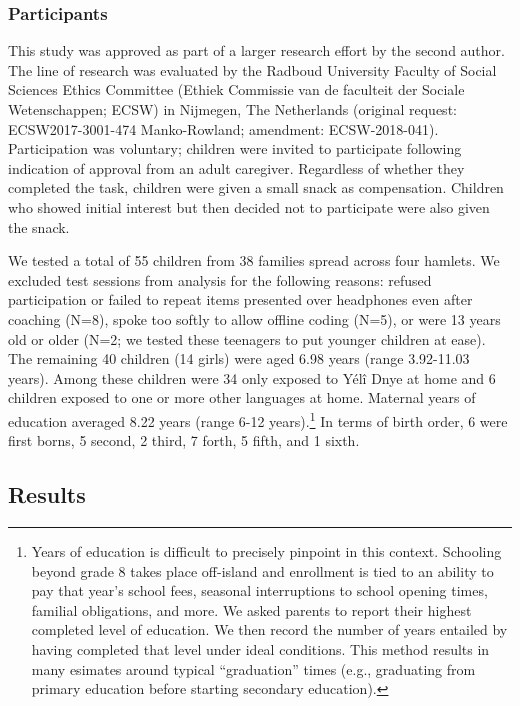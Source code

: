 \documentclass[english,,man,floatsintext]{apa6}
\begin{document}
\subsubsection{Participants}\label{participants}

This study was approved as part of a larger research effort by the
second author. The line of research was evaluated by the Radboud
University Faculty of Social Sciences Ethics Committee (Ethiek Commissie
van de faculteit der Sociale Wetenschappen; ECSW) in Nijmegen, The
Netherlands (original request: ECSW2017-3001-474 Manko-Rowland;
amendment: ECSW-2018-041). Participation was voluntary; children were
invited to participate following indication of approval from an adult
caregiver. Regardless of whether they completed the task, children were
given a small snack as compensation. Children who showed initial
interest but then decided not to participate were also given the snack.

We tested a total of 55 children from 38 families spread across four
hamlets. We excluded test sessions from analysis for the following
reasons: refused participation or failed to repeat items presented over
headphones even after coaching (N=8), spoke too softly to allow offline
coding (N=5), or were 13 years old or older (N=2; we tested these
teenagers to put younger children at ease). The remaining 40 children
(14 girls) were aged 6.98 years (range 3.92-11.03 years). Among these
children were 34 only exposed to Yélî Dnye at home and 6 children
exposed to one or more other languages at home. Maternal years of
education averaged 8.22 years (range 6-12 years).\footnote{Years of
  education is difficult to precisely pinpoint in this context.
  Schooling beyond grade 8 takes place off-island and enrollment is tied
  to an ability to pay that year's school fees, seasonal interruptions
  to school opening times, familial obligations, and more. We asked
  parents to report their highest completed level of education. We then
  record the number of years entailed by having completed that level
  under ideal conditions. This method results in many esimates around
  typical ``graduation'' times (e.g., graduating from primary education
  before starting secondary education).} In terms of birth order, 6 were
first borns, 5 second, 2 third, 7 forth, 5 fifth, and 1 sixth.

\subsection{Results}\label{results}
\end{document}
